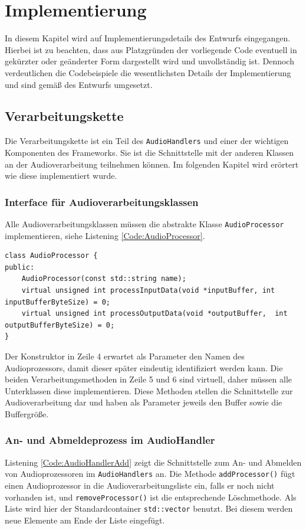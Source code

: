 \chapter{Implementierung}
In diesem Kapitel wird auf Implementierungsdetails des Entwurfs eingegangen. Hierbei ist zu beachten, dass aus Platzgründen der vorliegende Code eventuell in gekürzter oder geänderter Form dargestellt wird und unvollständig ist. Dennoch verdeutlichen die Codebeispiele die wesentlichsten Details der Implementierung und sind gemäß des Entwurfs umgesetzt.

\section{Verarbeitungskette}
Die Verarbeitungskette ist ein Teil des \texttt{AudioHandlers} und einer der wichtigen Komponenten des Frameworks. Sie ist die Schnittstelle mit der anderen Klassen an der Audioverarbeitung teilnehmen können. Im folgenden Kapitel wird erörtert wie diese implementiert wurde.

\subsection{Interface für Audioverarbeitungsklassen}
Alle Audioverarbeitungsklassen müssen die abstrakte Klasse \texttt{AudioProcessor} implementieren, siehe Listening \ref{Code:AudioProcessor}.

\begin{lstlisting}[caption={Interface des AudioProcessors},label={Code:AudioProcessor}]
class AudioProcessor {
public:
	AudioProcessor(const std::string name);
	virtual unsigned int processInputData(void *inputBuffer, int inputBufferByteSize) = 0;
	virtual unsigned int processOutputData(void *outputBuffer,  int outputBufferByteSize) = 0;
}
\end{lstlisting}
Der Konstruktor in Zeile 4 erwartet als Parameter den Namen des Audioprozessors, damit dieser später eindeutig identifiziert werden kann. Die beiden Verarbeitungsmethoden in Zeile 5 und 6 sind virtuell, daher müssen alle Unterklassen diese implementieren. Diese Methoden stellen die Schnittstelle zur Audioverarbeitung dar und haben als Parameter jeweils den Buffer sowie die Buffergröße.

\subsection{An- und Abmeldeprozess im AudioHandler}
Listening \ref{Code:AudioHandlerAdd} zeigt die Schnittstelle zum An- und Abmelden von Audioprozessoren im \texttt{AudioHandlers} an. Die Methode \texttt{addProcessor()} fügt einen Audioprozessor in die Audioverarbeitungsliste ein, falls er noch nicht vorhanden ist, und \texttt{removeProcessor()} ist die entsprechende Löschmethode. Als Liste wird hier der Standardcontainer \texttt{std::vector} benutzt. Bei diesem werden neue Elemente am Ende der Liste eingefügt.

